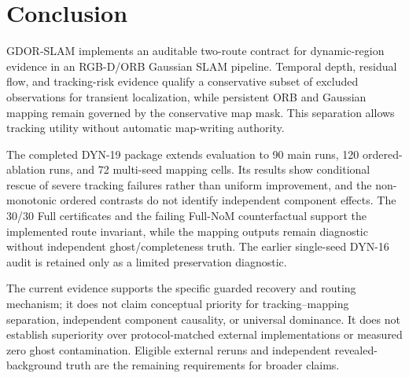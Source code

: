 \section{Conclusion}

GDOR-SLAM implements an auditable two-route contract for dynamic-region evidence in an RGB-D/ORB Gaussian SLAM pipeline.
Temporal depth, residual flow, and tracking-risk evidence qualify a conservative subset of excluded observations for transient localization, while persistent ORB and Gaussian mapping remain governed by the conservative map mask.
This separation allows tracking utility without automatic map-writing authority.

The completed DYN-19 package extends evaluation to 90 main runs, 120 ordered-ablation runs, and 72 multi-seed mapping cells.
Its results show conditional rescue of severe tracking failures rather than uniform improvement, and the non-monotonic ordered contrasts do not identify independent component effects.
The 30/30 Full certificates and the failing Full-NoM counterfactual support the implemented route invariant, while the mapping outputs remain diagnostic without independent ghost/completeness truth.
The earlier single-seed DYN-16 audit is retained only as a limited preservation diagnostic.

The current evidence supports the specific guarded recovery and routing mechanism; it does not claim conceptual priority for tracking--mapping separation, independent component causality, or universal dominance.
It does not establish superiority over protocol-matched external implementations or measured zero ghost contamination.
Eligible external reruns and independent revealed-background truth are the remaining requirements for broader claims.
